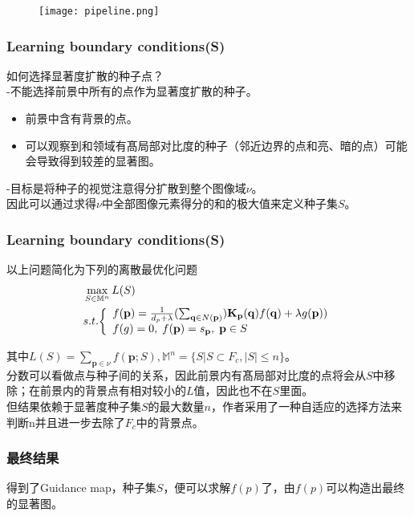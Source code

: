 \documentclass[notheorems,mathserif,table,compress]{beamer}  %
\begin{document}
%
\begin{frame}
\begin{figure}
\texttt{[image: pipeline.png]}
\end{figure}

\end{frame}

%
\begin{frame}
\frametitle{Learning boundary conditions(S)}
如何选择显著度扩散的种子点？\\
-不能选择前景中所有的点作为显著度扩散的种子。
\begin{itemize}
\item  前景中含有背景的点。
\item 可以观察到和领域有髙局部对比度的种子（邻近边界的点和亮、暗的点）可能会导致得到较差的显著图。
\end{itemize}

-目标是将种子的视觉注意得分扩散到整个图像域$\nu$。\\
因此可以通过求得$\nu$中全部图像元素得分的和的极大值来定义种子集$S$。

\end{frame}

%
\begin{frame}
\frametitle{Learning boundary conditions(S)}
以上问题简化为下列的离散最优化问题
\begin{equation*}
\begin{split}
&\max_{S\in \mathbb{M}^n}L(S)\\
&s.t.\bigg{\{}\begin{array}{ll}
f(\mathbf{p})=\frac{1}{d_p+\lambda}(\sum_{\mathbf{q}\in N(\mathbf{p})})\mathbf{K_p(q)}f(\mathbf{q})+\lambda g(\mathbf{p}))\\
f(g)=0,\;f(\mathbf{p})=s_\mathbf{p},\;\mathbf{p}\in S
\end{array} 
\end{split}
\end{equation*}

其中$L(S)=\sum_{\mathbf{p}\in \nu}f(\mathbf{p};S),\mathbb{M}^n=\{S|S\subset F_c,|S|\leq n\}$。\\
分数可以看做点与种子间的关系，因此前景内有髙局部对比度的点将会从$S$中移除；在前景内的背景点有相对较小的$L$值，因此也不在$S$里面。\\
但结果依赖于显著度种子集$S$的最大数量$n$，作者采用了一种自适应的选择方法来判断n并且进一步去除了$F_c$中的背景点。
\end{frame}

%
\begin{frame}
\frametitle{ 最终结果}
得到了Guidance map，种子集$S$，便可以求解$f(p)$了，由$f(p)$可以构造出最终的显著图。

\end{frame}
\end{document}
